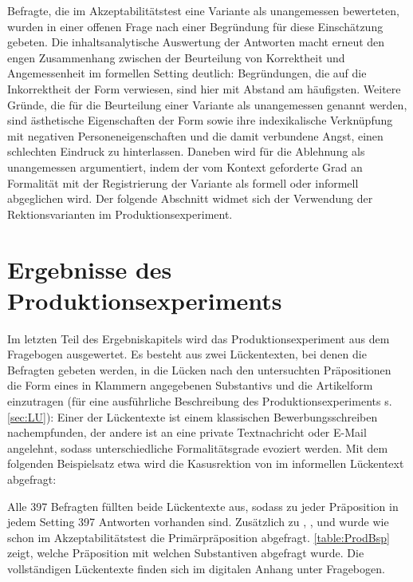 Befragte, die im Akzeptabilitätstest eine Variante als unangemessen bewerteten, wurden in einer offenen Frage nach einer Begründung für diese Einschätzung gebeten. 
Die inhaltsanalytische Auswertung der Antworten macht erneut den engen Zusammenhang zwischen der Beurteilung von Korrektheit und Angemessenheit im formellen Setting deutlich:
Begründungen, die auf die Inkorrektheit der Form verwiesen, sind hier mit Abstand am häufigsten. 
Weitere Gründe, die für die Beurteilung einer Variante als unangemessen genannt werden, sind ästhetische Eigenschaften der Form sowie ihre indexikalische Verknüpfung mit negativen Personeneigenschaften und die damit verbundene Angst, einen schlechten Eindruck zu hinterlassen. 
Daneben wird für die Ablehnung als unangemessen argumentiert, indem der vom Kontext geforderte Grad an Formalität mit der Registrierung der Variante als formell oder informell abgeglichen wird. 
Der folgende Abschnitt widmet sich der Verwendung der Rektionsvarianten im Produktionsexperiment.  \section{Ergebnisse des Produktionsexperiments}
\label{sec:ErgProduktion}
Im letzten Teil des Ergebniskapitels wird das Produktionsexperiment aus dem Fragebogen ausgewertet. 
Es besteht aus zwei Lückentexten, bei denen die Befragten gebeten werden, in die Lücken nach den untersuchten Präpositionen die Form eines in Klammern angegebenen Substantivs und die Artikelform einzutragen (für eine ausführliche Beschreibung des Produktionsexperiments s. \autoref{sec:LU}):
Einer der Lückentexte ist einem klassischen Bewerbungsschreiben nachempfunden, der andere ist an eine private Textnachricht oder E-Mail angelehnt, sodass unterschiedliche Formalitätsgrade evoziert werden. 
Mit dem folgenden Beispielsatz etwa wird die Kasusrektion von \wegen{} im informellen Lückentext abgefragt:
\begin{exe}
\ex {}
\end{exe} 
Alle 397 Befragten füllten beide Lückentexte aus, sodass zu jeder Präposition in jedem Setting 397 Antworten vorhanden sind. 
Zusätzlich zu \wegen, \waehrend, \dank{} und \gegenueber{} wurde wie schon im Akzeptabilitätstest die Primärpräposition  abgefragt. 
\autoref{table:ProdBsp} zeigt, welche Präposition mit welchen Substantiven abgefragt wurde.  
Die vollständigen Lückentexte finden sich im digitalen Anhang unter Fragebogen.

